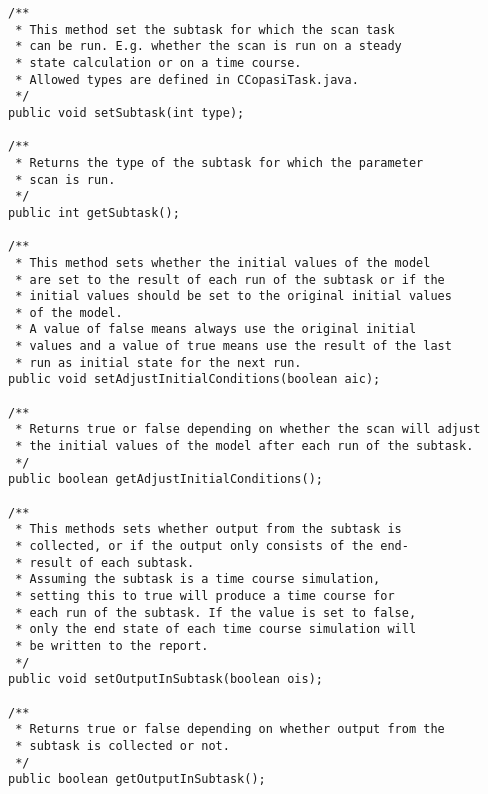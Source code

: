 \documentclass[a4,10pt]{article}
\begin{document}
\begin{lstlisting}
/**
 * This method set the subtask for which the scan task
 * can be run. E.g. whether the scan is run on a steady
 * state calculation or on a time course.
 * Allowed types are defined in CCopasiTask.java.
 */
public void setSubtask(int type);

/**
 * Returns the type of the subtask for which the parameter
 * scan is run.
 */
public int getSubtask();

/**
 * This method sets whether the initial values of the model
 * are set to the result of each run of the subtask or if the 
 * initial values should be set to the original initial values
 * of the model.
 * A value of false means always use the original initial
 * values and a value of true means use the result of the last 
 * run as initial state for the next run.
public void setAdjustInitialConditions(boolean aic);

/**
 * Returns true or false depending on whether the scan will adjust
 * the initial values of the model after each run of the subtask.
 */
public boolean getAdjustInitialConditions();

/**
 * This methods sets whether output from the subtask is
 * collected, or if the output only consists of the end-
 * result of each subtask.
 * Assuming the subtask is a time course simulation, 
 * setting this to true will produce a time course for
 * each run of the subtask. If the value is set to false,
 * only the end state of each time course simulation will
 * be written to the report.
 */
public void setOutputInSubtask(boolean ois);

/**
 * Returns true or false depending on whether output from the
 * subtask is collected or not.
 */
public boolean getOutputInSubtask();
\end{lstlisting}
\end{document}
